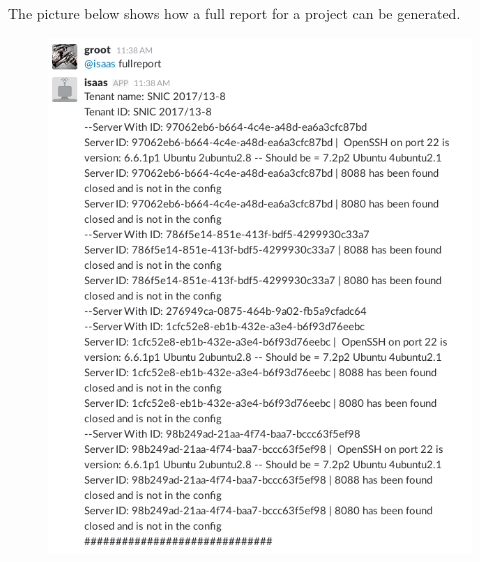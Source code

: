\documentclass[12pt]{article}
\begin{document}
The picture below shows how a full report for a project can be generated.
\begin{figure}[H]
    \begin{mdframed}
    \includegraphics[scale=.5]{./pic/2017-06-26-113829_608x740_scrot.png}
    \end{mdframed}
\end{figure}
\end{document}
